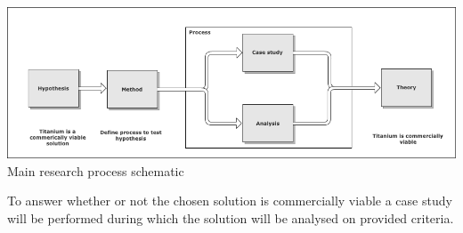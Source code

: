 \begin{centering}
\includegraphics[scale=0.5]{images/process.png}\\{Main research process schematic}\\
\end{centering}

To answer whether or not the chosen solution is commercially viable a case study will be performed during which the solution will be analysed on provided criteria.